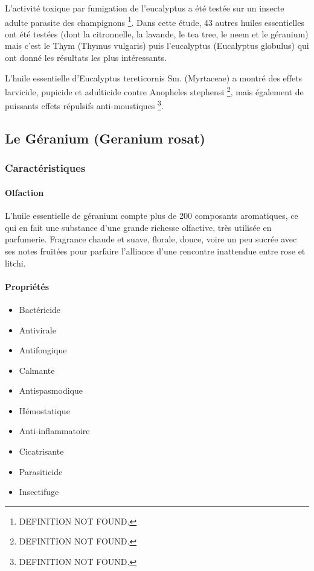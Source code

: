 \documentclass[12pt,a4wide]{article}
\begin{document}
L'activité toxique  par fumigation de l'eucalyptus  a été testée sur  un insecte
adulte  parasite  des champignons  \footnote{DEFINITION NOT FOUND.}.  Dans  cette  étude, 43  autres  huiles
essentielles ont été  testées (dont la citronnelle, la lavande,  le tea tree, le
neem et  le géranium)  mais c'est  le Thym  (Thymus vulgaris)  puis l'eucalyptus
(Eucalyptus globulus) qui ont donné les résultats les plus intéressants.

L'huile  essentielle d'Eucalyptus  tereticornis  Sm.  (Myrtaceae)  a montré  des
effets larvicide, pupicide  et adulticide contre Anopheles  stephensi \footnote{DEFINITION NOT FOUND.}, mais
également de puissants effets répulsifs anti-moustiques \footnote{DEFINITION NOT FOUND.}.



\subsection{Le Géranium (Geranium rosat)}
\label{sec-4-6}
\subsubsection{Caractéristiques}
\label{sec-4-6-1}
\paragraph{Olfaction}
\label{sec-4-6-1-1}
L'huile essentielle de géranium compte plus de 200 composants aromatiques, ce qui en fait une substance d'une grande richesse olfactive, très utilisée en parfumerie.
Fragrance chaude et suave, florale, douce, voire un peu sucrée avec ses notes fruitées pour parfaire l'alliance d'une rencontre inattendue entre rose et litchi.
\paragraph{Propriétés}
\label{sec-4-6-1-2}
\begin{itemize}
\item Bactéricide
\item Antivirale
\item Antifongique
\item Calmante
\item Antispasmodique
\item Hémostatique
\item Anti-inflammatoire
\item Cicatrisante
\item Parasiticide
\item Insectifuge
\end{itemize}
\end{document}
